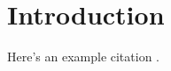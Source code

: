 \section{Introduction} \label{sec:introduction}

Here's an example citation \citep{faa2024complete}.
